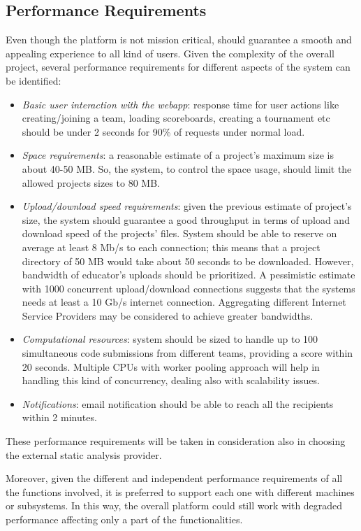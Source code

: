\subsection{Performance Requirements}
Even though the platform is not mission critical, should guarantee a smooth and appealing experience to all kind of users. Given the complexity of the overall project, several performance requirements for different aspects of the system can be identified:
\begin{itemize}
    \item \textit{Basic user interaction with the webapp}: response time for user actions like creating/joining a team, loading scoreboards, creating a tournament etc should be under 2 seconds for 90\% of requests under normal load.
    \item \textit{Space requirements}: a reasonable estimate of a project’s maximum size is about 40-50 MB. So, the system, to control the space usage, should limit the allowed projects sizes to 80 MB.
    \item \textit{Upload/download speed requirements}: given the previous estimate of project’s size, the system should guarantee a good throughput in terms of upload and download speed of the projects’ files. System should be able to reserve on average at least 8 Mb/s to each connection; this means that a project directory of 50 MB would take about 50 seconds to be downloaded. However, bandwidth of educator’s uploads should be prioritized. A pessimistic estimate with 1000 concurrent upload/download connections suggests that the systems needs at least a 10 Gb/s internet connection. Aggregating different Internet Service Providers may be considered to achieve greater bandwidths.
    \item \textit{Computational resources}: system should be sized to handle up to 100 simultaneous code submissions from different teams, providing a score within 20 seconds. Multiple CPUs with worker pooling approach will help in handling this kind of concurrency, dealing also with scalability issues.
    \item \textit{Notifications}: email notification should be able to reach all the recipients within 2 minutes.
\end{itemize}
These performance requirements will be taken in consideration also in choosing the external static analysis provider.

Moreover, given the different and independent performance requirements of all the functions involved, it is preferred to support each one with different machines or subsystems. In this way, the overall platform could still work with degraded performance affecting only a part of the functionalities.

